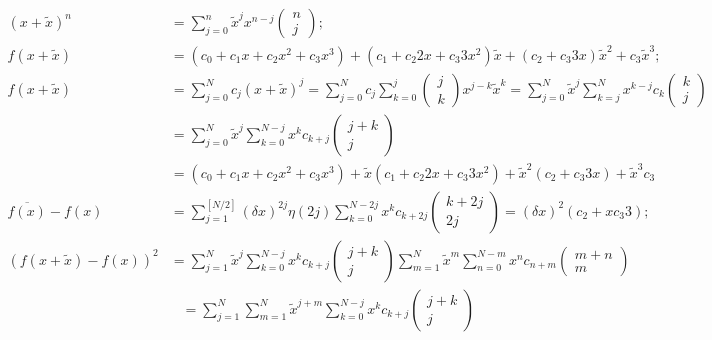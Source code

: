 \documentclass[twoside]{article}
\numberwithin{equation}{section}
\newcommand{\eqspace}{\;\;\;}
\begin{document}
\begin{align*}
(x + \tilde{x})^n &= \sum_{j=0}^{n} \tilde{x}^j x^{n - j}  \begin{pmatrix} n \\ j \end{pmatrix}; \\
f(x + \tilde{x}) &= ( c_0 + c_1 x + c_2 x^2 + c_3 x^3 )  + ( c_1 + c_2 2 x + c_3 3 x^2 ) \tilde{x} +  ( c_2 + c_3 3 x ) \tilde{x}^2 
   + c_3 \tilde{x}^3; \\
f(x + \tilde{x}) &= \sum_{j=0}^{N} c_j (x + \tilde{x})^j 
     = \sum_{j=0}^{N} c_j  \sum_{k=0}^{j} \begin{pmatrix} j \\ k \end{pmatrix} x^{j-k}  \tilde{x}^k
     = \sum_{j=0}^{N} \tilde{x}^{j} \sum_{k=j}^{N} x^{k - j} c_k \begin{pmatrix} k \\ j \end{pmatrix} \\
 & = \sum_{j=0}^{N} \tilde{x}^{j} \sum_{k=0}^{N - j} x^{k} c_{k + j} \begin{pmatrix} j + k \\ j \end{pmatrix} \\   
 &= ( c_0 + c_1 x + c_2 x^2 + c_3 x^3 ) + \tilde{x} (c_1 + c_2 2 x + c_3 3 x^2 ) + \tilde{x}^2 ( c_2 + c_3 3 x ) + \tilde{x}^3 c_3 \\
\overline{f(x)} - f(x) &= \sum_{j=1}^{[N/2]} (\delta x)^{2j} \eta(2j) \sum_{k=0}^{N - 2j} x^{k} c_{k + 2j} \begin{pmatrix} k + 2j \\ 2j \end{pmatrix}
  = (\delta x)^2 ( c_2  + x c_3 3 ); \\
(f(x + \tilde{x}) - f(x))^2 &=
 \sum_{j=1}^{N} \tilde{x}^{j} \sum_{k=0}^{N-j} x^{k} c_{k + j} \begin{pmatrix} j + k \\ j \end{pmatrix} 
 \sum_{m=1}^{N} \tilde{x}^{m} \sum_{n=0}^{N-m} x^{n} c_{n + m} \begin{pmatrix} m + n \\ m \end{pmatrix} \\
    &\eqspace = \sum_{j=1}^{N} \sum_{m=1}^{N} \tilde{x}^{j+m} \sum_{k=0}^{N - j} x^k c_{k+j} \begin{pmatrix} j + k \\ j \end{pmatrix}

\end{align*}
\end{document}

